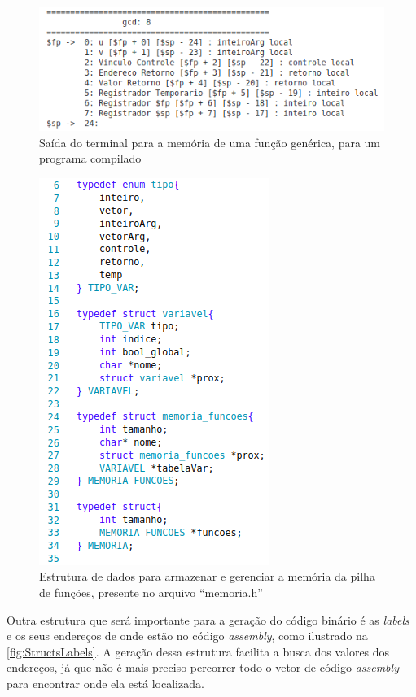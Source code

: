 \documentclass[
	12pt,				%
	oneside,
	a4paper,			%
	english,			%
	french,				%
	spanish,			%
	brazil,				%
	]{abntex2}
\begin{document}
\begin{figure}[tbhp]
\centering 
\caption{Saída do terminal para a memória de uma função genérica, para um programa compilado} 
\label{fig:SaidaMemoria}
\graphicspath{ {./imgs/} } 
\includegraphics[scale=0.6]{imgs/Codigo/Saida_Memoria.png}
\end{figure}

\begin{figure}[tbhp]
\centering 
\caption{Estrutura de dados para armazenar e gerenciar a memória da pilha de funções, presente no arquivo \nohyphens{``memoria.h''}} 
\label{fig:StructsMemoria}
\graphicspath{ {./imgs/} } 
\includegraphics[scale=0.4]{imgs/Codigo/Struct_Memoria.png}
\end{figure}

Outra estrutura que será importante para a geração do código binário é as \emph{labels} e os seus endereços de onde estão no código \emph{assembly}, como ilustrado na \autoref{fig:StructsLabels}. A geração dessa estrutura facilita a busca dos valores dos endereços, já que não é mais preciso percorrer todo o vetor de código \emph{assembly} para encontrar onde ela está localizada.
\end{document}
